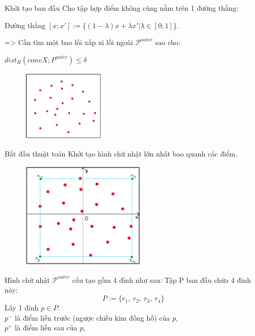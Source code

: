 \documentclass[11pt]{beamer}
\theoremstyle{definition}
\theoremstyle{plain}
\theoremstyle{plain}
\theoremstyle{remark}
\begin{document}
	
	\begin{frame}{Khởi tạo ban đầu}
		Cho tập hợp điểm không cùng nằm trên 1 đường thẳng:
		
		\begin{center}
			Đường thẳng $[x; x'] := \{(1 - \lambda)x + \lambda x' | \lambda \in [0; 1]\}$.\\
		\end{center}
		=> Cần tìm một bao lồi xấp xỉ lồi ngoài $\mathcal{P}^{outer}$ sao cho: 
		\begin{center}
			$dist_H(conv X; P^{outer}) \leq \delta$
		\end{center}
		\begin{figure}
			\begin{center}
				\includegraphics[width=4cm]{./initial_sub_point.jpg}
			\end{center}
		\end{figure}
	\end{frame}
	\begin{frame}{Bắt đầu thuật toán}
		Khởi tạo hình chữ nhật lớn nhất bao quanh các điểm.
		\begin{figure}
			
			\includegraphics[width=6cm]{khoi_tao_hcn_bao_quanh}
		\end{figure}
	\end{frame}
	\begin{frame}
		Hình chữ nhật $\mathcal{P}^{outer}$ cấu tạo gồm 4 đỉnh như sau:
		Tập P ban đầu chứa 4 đỉnh này:\\
		\begin{equation}\label{def_4r-2}
			P := \{r_1,\ r_2,\ r_3,\ r_4\}
		\end{equation}
			Lấy 1 đỉnh $p \in P$.\\
		$p^{-}$ là điểm liền trước (ngược chiều kim đồng hồ) của $p$,\\
		$p^{+}$ là điểm liền sau của $p$,\\
	\end{frame}
\end{document}
